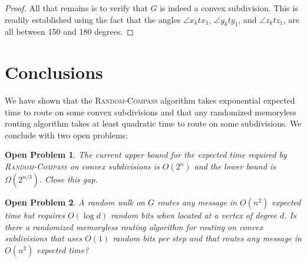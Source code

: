 \documentclass [letterpaper] {patmorin}
\newtheorem{op}{Open Problem}
\begin{document}
\begin{proof}
All that remains is to verify that $G$ is indeed a convex subdivision.  This is
readily established using the fact that the angles $\angle x_k t x_1$, $\angle y_k t y_1$, and $\angle z_k t z_1$, are all between 150 and 180 degrees.
%
%
%
%
%
%
\end{proof}

\section{Conclusions}

We have shown that the \textsc{Random-Compass} algorithm takes exponential
expected time to route on some convex subdivisions and that any randomized
memoryless routing algorithm takes at least quadratic time to route on some
subdivisions.  We conclude with two open problems:

\begin{op}
The current upper bound for the expected time required by \textsc{Random-Compass} on convex subdivisions is $O(2^n)$ and the lower bound is $\Omega(2^{n/3})$.  Close this gap.
\end{op}

\begin{op}
A random walk on $G$ routes any message in $O(n^2)$ expected time but requires $O(\log d)$ random bits when located at a vertex of degree $d$.  Is there a randomized memoryless routing algorithm for routing on convex subdivisions that uses $O(1)$ random bits per step and that routes any message in $O(n^2)$ expected time?
\end{op}








\end{document}
